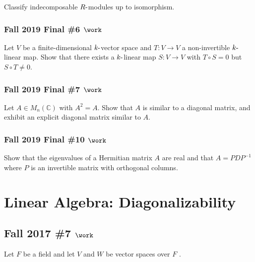 Classify indecomposable \(R{\hbox{-}}\)modules up to isomorphism.

\hypertarget{fall-2019-final-6-work}{%
\subsubsection{\texorpdfstring{Fall 2019 Final \#6
\(\work\)}{Fall 2019 Final \#6 \textbackslash work}}\label{fall-2019-final-6-work}}

Let \(V\) be a finite-dimensional \(k{\hbox{-}}\)vector space and
\(T:V\to V\) a non-invertible \(k{\hbox{-}}\)linear map. Show that there
exists a \(k{\hbox{-}}\)linear map \(S:V\to V\) with \(T\circ S = 0\)
but \(S\circ T\neq 0\).

\hypertarget{fall-2019-final-7-work}{%
\subsubsection{\texorpdfstring{Fall 2019 Final \#7
\(\work\)}{Fall 2019 Final \#7 \textbackslash work}}\label{fall-2019-final-7-work}}

Let \(A\in M_n({\mathbb{C}})\) with \(A^2 = A\). Show that \(A\) is
similar to a diagonal matrix, and exhibit an explicit diagonal matrix
similar to \(A\).

\hypertarget{fall-2019-final-10-work}{%
\subsubsection{\texorpdfstring{Fall 2019 Final \#10
\(\work\)}{Fall 2019 Final \#10 \textbackslash work}}\label{fall-2019-final-10-work}}

Show that the eigenvalues of a Hermitian matrix \(A\) are real and that
\(A = PDP^{-1}\) where \(P\) is an invertible matrix with orthogonal
columns.

\hypertarget{linear-algebra-diagonalizability}{%
\section{Linear Algebra:
Diagonalizability}\label{linear-algebra-diagonalizability}}

\hypertarget{fall-2017-7-work}{%
\subsection{\texorpdfstring{Fall 2017 \#7
\(\work\)}{Fall 2017 \#7 \textbackslash work}}\label{fall-2017-7-work}}

Let \(F\) be a field and let \(V\) and \(W\) be vector spaces over \(F\)
.

